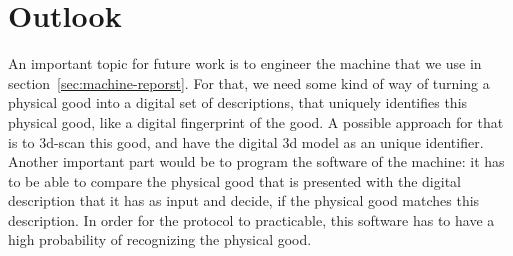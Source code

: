 \documentclass{cacthesis}
\begin{document}


\section{Outlook}

An important topic for future work is to engineer the machine that we use in section~\ref{sec:machine-reporst}. For that, we need some kind of way of turning a physical good into a digital set of descriptions, that uniquely identifies this physical good, like a digital fingerprint of the good. A possible approach for that is to 3d-scan this good, and have the digital 3d model as an unique identifier. Another important part would be to program the software of the machine: it has to be able to compare the physical good that is presented with the digital description that it has as input and decide, if the physical good matches this description. In order for the protocol to practicable, this software has to have a high probability of recognizing the physical good.




	
	
	\printbibliography
	
	\appendix
\end{document}
